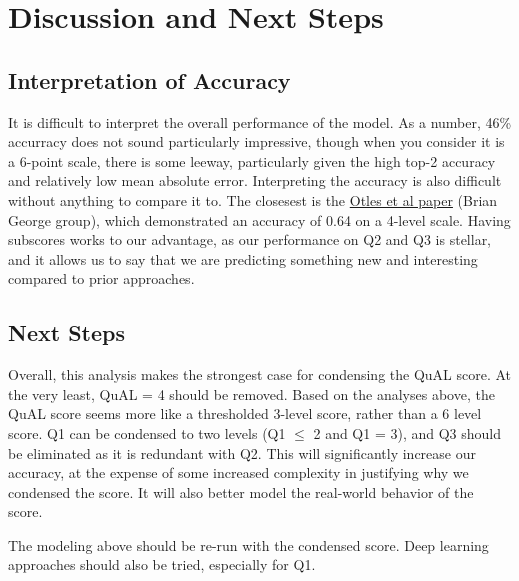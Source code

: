 \documentclass[
  letterpaper,
  DIV=11,
  numbers=noendperiod]{scrartcl}
\begin{document}
\hypertarget{discussion-and-next-steps}{%
\section{Discussion and Next Steps}\label{discussion-and-next-steps}}

\hypertarget{interpretation-of-accuracy}{%
\subsection{Interpretation of
Accuracy}\label{interpretation-of-accuracy}}

It is difficult to interpret the overall performance of the model. As a
number, 46\% accurracy does not sound particularly impressive, though
when you consider it is a 6-point scale, there is some leeway,
particularly given the high top-2 accuracy and relatively low mean
absolute error. Interpreting the accuracy is also difficult without
anything to compare it to. The closesest is the
\href{https://pubmed.ncbi.nlm.nih.gov/33951682/}{Otles et al paper}
(Brian George group), which demonstrated an accuracy of 0.64 on a
4-level scale. Having subscores works to our advantage, as our
performance on Q2 and Q3 is stellar, and it allows us to say that we are
predicting something new and interesting compared to prior approaches.

\hypertarget{next-steps}{%
\subsection{Next Steps}\label{next-steps}}

Overall, this analysis makes the strongest case for condensing the QuAL
score. At the very least, QuAL = 4 should be removed. Based on the
analyses above, the QuAL score seems more like a thresholded 3-level
score, rather than a 6 level score. Q1 can be condensed to two levels
(Q1 \(\leq\) 2 and Q1 = 3), and Q3 should be eliminated as it is
redundant with Q2. This will significantly increase our accuracy, at the
expense of some increased complexity in justifying why we condensed the
score. It will also better model the real-world behavior of the score.

The modeling above should be re-run with the condensed score. Deep
learning approaches should also be tried, especially for Q1.
\end{document}
